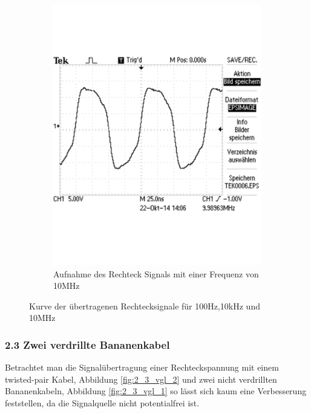 \documentclass[12pt,a4paper]{article}
\begin{document}
\begin{figure}[H]
\begin{subfigure}[b]{0.28\textwidth}
                \includegraphics[width=\textwidth , scale = 1]{2_2_rech_10mhz.pdf}
                \caption[Aufnahme des Rechtecksignals mit einer Frequenz von 10MHz]{Aufnahme des Rechteck Signals mit einer Frequenz von 10MHz}
  				\label{fig:2_2_rech_10mhz}
        \end{subfigure}
        \caption{Kurve der übertragenen Rechtecksignale für 100Hz,10kHz und 10MHz}
        \label{fig:2_2_rech_vergleich}
\end{figure}
\newpage
\subsubsection{2.3 Zwei verdrillte Bananenkabel}

Betrachtet man die Signalübertragung einer Rechteckspannung mit einem twisted-pair Kabel, Abbildung \ref{fig:2_3_vgl_2} und zwei nicht verdrillten Bananenkabeln, Abbildung \ref{fig:2_3_vgl_1} so lässt sich kaum eine Verbesserung feststellen, da die Signalquelle nicht potentialfrei ist.
\end{document}
